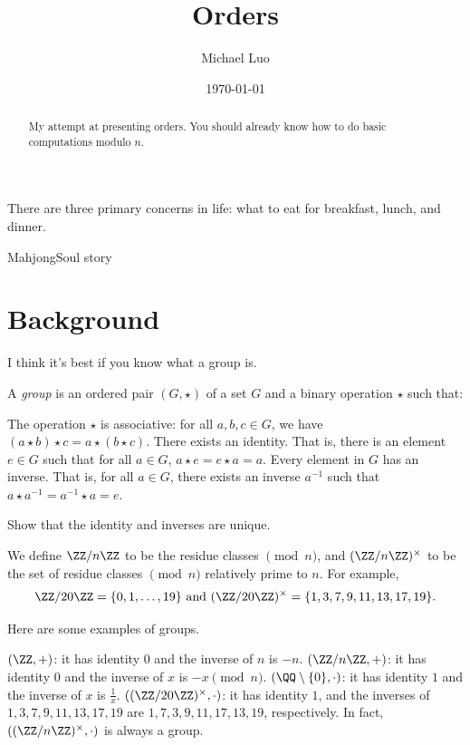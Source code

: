 \documentclass[11pt]{scrartcl}
\title{Orders}
\author{Michael Luo}
\date{\today}
\begin{document}
\maketitle

\epigraph{There are three primary concerns in life: what to eat for breakfast, lunch, and dinner.}{MahjongSoul story}

\begin{abstract}
    My attempt at presenting orders. You should already know how to do basic computations modulo $n$.
\end{abstract}

\section{Background}

I think it's best if you know what a group is.
\begin{definition}
	A \emph{group} is an ordered pair $(G,\star)$ of a set $G$ and a binary operation $\star$ such that:
	\begin{itemize}
		\ii The operation $\star$ is associative: for all $a,b,c \in G$, we have $(a \star b) \star c = a \star (b \star c)$.
		\ii There exists an identity. That is, there is an element $e \in G$ such that for all $a \in G$, $a \star e = e \star a = a$.
		\ii Every element in $G$ has an inverse. That is, for all $a \in G$, there exists an inverse $a^{-1}$ such that $a \star a^{-1} = a^{-1} \star a = e$.
	\end{itemize}
\end{definition}

\begin{exercise}
	Show that the identity and inverses are unique.
\end{exercise}

\begin{definition}
	We define $\ZZ/n\ZZ$ to be the residue classes $\pmod{n}$, and $(\ZZ/n\ZZ)^\times$ to be the set of residue classes $\pmod{n}$ relatively prime to $n$. For example,
	\[\ZZ/20\ZZ = \{0,1,\dots,19\} \text{ and } (\ZZ/20\ZZ)^\times = \{1,3,7,9,11,13,17,19\}.\]
\end{definition}

Here are some examples of groups.
\begin{itemize}
	\ii $(\ZZ,+)$: it has identity $0$ and the inverse of $n$ is $-n$.
	\ii $(\ZZ/n\ZZ,+)$: it has identity $0$ and the inverse of $x$ is $-x \pmod{n}$.
	\ii $(\QQ \setminus \{0\},\cdot)$: it has identity $1$ and the inverse of $x$ is $\frac1x$.
	\ii $((\ZZ/20\ZZ)^\times,\cdot)$: it has identity $1$, and the inverses of $1,3,7,9,11,13,17,19$ are $1,7,3,9,11,17,13,19$, respectively. In fact, $((\ZZ/n\ZZ)^\times,\cdot)$ is always a group.
\end{itemize}
\end{document}
